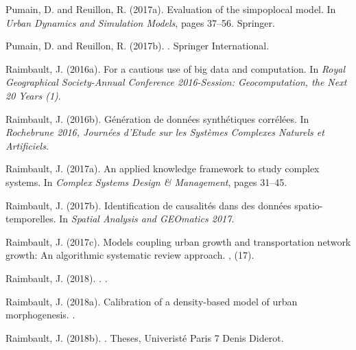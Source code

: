 \documentclass[graybox]{svmult}
\begin{document}
\begin{thebibliography}{}
Pumain, D. and Reuillon, R. (2017a).
\newblock Evaluation of the simpoplocal model.
\newblock In {\em Urban Dynamics and Simulation Models}, pages 37--56.
  Springer.

Pumain, D. and Reuillon, R. (2017b).
.
\newblock Springer International.

Raimbault, J. (2016a).
\newblock For a cautious use of big data and computation.
\newblock In {\em Royal Geographical Society-Annual Conference 2016-Session:
  Geocomputation, the Next 20 Years (1)}.

Raimbault, J. (2016b).
\newblock G{\'e}n{\'e}ration de donn{\'e}es synth{\'e}tiques corr{\'e}l{\'e}es.
\newblock In {\em Rochebrune 2016, Journ{\'e}es d'Etude sur les Syst{\`e}mes
  Complexes Naturels et Artificiels}.

Raimbault, J. (2017a).
\newblock An applied knowledge framework to study complex systems.
\newblock In {\em Complex Systems Design \& Management}, pages 31--45.

Raimbault, J. (2017b).
\newblock Identification de causalités dans des données spatio-temporelles.
\newblock In {\em Spatial Analysis and GEOmatics 2017}.

Raimbault, J. (2017c).
\newblock Models coupling urban growth and transportation network growth: An
  algorithmic systematic review approach.
, (17).

{Raimbault}, J. (2018).
.
.

Raimbault, J. (2018a).
\newblock Calibration of a density-based model of urban morphogenesis.
.

Raimbault, J. (2018b).
.
\newblock Theses, {Univerist{\'e} Paris 7 Denis Diderot}.


\end{thebibliography}
\end{document}
